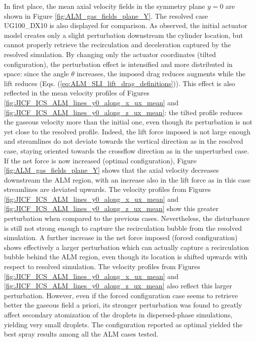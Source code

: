 In first place, the mean axial velocity fields in the symmetry plane $y = 0$ are shown in Figure \ref{fig:ALM_gas_fields_plane_Y}. The resolved case UG100\_DX10 is also displayed for comparison.  As observed, the initial actuator model creates only a slight perturbation downstream the cylinder location, but cannot properly retrieve the recirculation and deceleration captured by the resolved simulation. By changing only the actuator coordinates (tilted configuration), the perturbation effect is intensified and more distributed in space: since the angle $\theta$ increases, the imposed drag reduces augments while the lift reduces (Eqs. (\ref{eq:ALM_SLI_lift_drag_definitions})). This effect is also reflected in the mean velocity profiles of Figures \ref{fig:JICF_ICS_ALM_lines_y0_along_x_ux_mean} and \ref{fig:JICF_ICS_ALM_lines_y0_along_z_ux_mean}: the tilted profile reduces the gaseous velocity more than the initial one, even though its perturbation is not yet close to the resolved profile. Indeed, the lift force imposed is not large enough and streamlines do not deviate towards the vertical direction as in the resolved case, staying oriented towards the crossflow direction as in the unperturbed case. If the net force is now increased (optimal configuration),  Figure \ref{fig:ALM_gas_fields_plane_Y} shows that the axial velocity decreases downstream the ALM region, with an increase also in the lift force as in this case streamlines are deviated upwards. The velocity profiles from Figures \ref{fig:JICF_ICS_ALM_lines_y0_along_x_ux_mean} and \ref{fig:JICF_ICS_ALM_lines_y0_along_z_ux_mean} show this greater perturbation when compared to the previous cases. Nevertheless, the disturbance is still not strong enough to capture the recirculation bubble from the resolved simulation. A further increase in the net force imposed (forced configuration) shows effectively a larger perturbation which can actually capture a recirculation bubble behind the ALM region, even though its location is shifted upwards with respect to resolved simulation. The  velocity profiles from Figures \ref{fig:JICF_ICS_ALM_lines_y0_along_x_ux_mean} and \ref{fig:JICF_ICS_ALM_lines_y0_along_z_ux_mean} also reflect this larger perturbation. However, even if the forced configuration case seems to retrieve better the gaseous field a priori, its stronger perturbation was found to greatly affect secondary atomization of the droplets in dispersed-phase simulations, yielding very small droplets. The configuration reported as optimal yielded the best spray results among all the ALM cases tested. %


